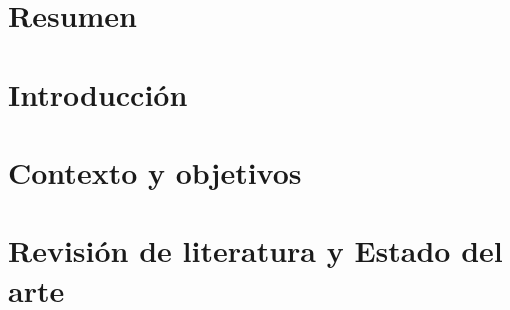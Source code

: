 \documentclass[letterpaper, 11pt, oneside]{book}
\begin{document}
	
\renewcommand{\tablename}{Tabla}



\renewcommand{\thepage}{\roman{page}}


\newpage



\renewcommand{\contentsname}{Tabla de Contenido}
\tableofcontents

\renewcommand{\listfigurename}{Lista de Figuras}
\listoffigures 

\renewcommand{\listtablename}{Lista de tablas}
\listoftables

\chapter*{Resumen}
\label{capResumen}



\thispagestyle{empty}


\chapter*{Introducción}
\label{capIntro}

\thispagestyle{empty}


\chapter{Contexto y objetivos}
\label{cap1}
\renewcommand{\thepage}{\arabic{page}}
\setcounter{page}{1}














\chapter[Revisión de literatura y Estado del arte]{Revisión de literatura y Estado del arte}
\label{cap2}
\end{document}
